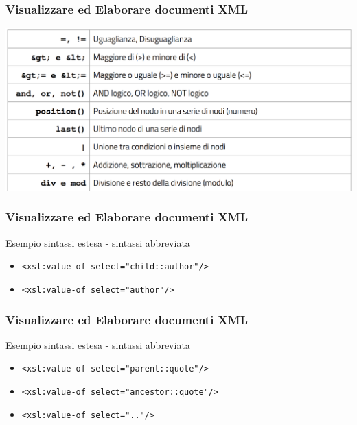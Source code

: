 \begin{frame}
    \frametitle{Visualizzare ed Elaborare documenti XML}
    \addtocounter{nframe}{1}
    
    \begin{center}
        \includegraphics[width=.95\textwidth]{imgs/Tab-Operatori-Predicato.png}
    \end{center}

\end{frame}

\begin{frame}
    \frametitle{Visualizzare ed Elaborare documenti XML}
    \addtocounter{nframe}{1}
    

    \begin{block}{Esempio sintassi estesa - sintassi abbreviata}
        \begin{itemize}
            \item \texttt{<xsl:value-of select="child::author"/>}
            \item \texttt{<xsl:value-of select="author"/>}
        \end{itemize}
    \end{block}

\end{frame}

\begin{frame}
    \frametitle{Visualizzare ed Elaborare documenti XML}
    \addtocounter{nframe}{1}
    

    \begin{block}{Esempio sintassi estesa - sintassi abbreviata}
        \begin{itemize}
            \item \texttt{<xsl:value-of select="parent::quote"/>}
            \item \texttt{<xsl:value-of select="ancestor::quote"/>}
            \item \texttt{<xsl:value-of select=".."/>}
        \end{itemize}
    \end{block}

\end{frame}

